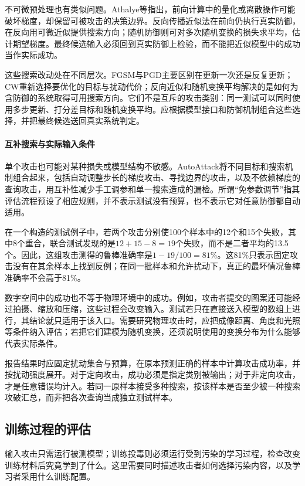 不可微预处理也有类似问题。Athalye等指出，前向计算中的量化或离散操作可能破坏梯度，却保留可被攻击的决策边界。反向传播近似法在前向仍执行真实防御，在反向用可微近似提供搜索方向；随机防御则可对多次随机变换的损失求平均，估计期望梯度。最终候选输入必须回到真实防御上检验，而不能把近似模型中的成功当作实际成功。

这些搜索改动处在不同层次。FGSM与PGD主要区别在更新一次还是反复更新；CW重新选择要优化的目标与扰动代价；反向近似和随机变换平均解决的是如何为含防御的系统取得可用搜索方向。它们不是互斥的攻击类别：同一测试可以同时使用多步更新、打分差目标和随机变换平均。应根据模型接口和防御机制组合这些选择，并把最终候选送回真实系统判定。

\paragraph{互补搜索与实际输入条件}

单个攻击也可能对某种损失或模型结构不敏感。AutoAttack将不同目标和搜索机制组合起来，包括自动调整步长的梯度攻击、寻找边界的攻击，以及不依赖梯度的查询攻击，用互补性减少手工调参和单一搜索造成的漏检。所谓“免参数调节”指其评估流程预设了相应规则，并不表示测试没有预算，也不表示它对任意防御都自动适用。

在一个构造的测试例子中，若两个攻击分别使100个样本中的12个和15个失败，其中8个重合，联合测试发现的是$12+15-8=19$个失败，而不是二者平均的13.5个。因此，这组攻击测得的鲁棒准确率是$1-19/100=81\%$。这81\%只表示固定攻击没有在其余样本上找到反例；在同一批样本和允许扰动下，真正的最坏情况鲁棒准确率不会高于81\%。

数字空间中的成功也不等于物理环境中的成功。例如，攻击者提交的图案还可能经过拍摄、缩放和压缩，这些过程会改变输入。测试若只在直接送入模型的数组上进行，其结论就只适用于该入口。需要研究物理攻击时，应把成像距离、角度和光照等条件纳入评估；若把它们建模为随机变换，还须说明使用的变换分布为什么能够代表实际条件。

报告结果时应固定扰动集合与预算，在原本预测正确的样本中计算攻击成功率，并按扰动强度展开。对于定向攻击，成功必须是指定类别被输出；对于非定向攻击，才是任意错误均计入。若同一原样本接受多种搜索，按该样本是否至少被一种搜索攻破汇总，而非把各次查询当成独立测试样本。

\subsection{训练过程的评估}
\label{sec:security-training-test}

输入攻击只需运行被测模型；训练投毒则必须运行受到污染的学习过程，检查改变训练材料后究竟学到了什么。这里需要同时描述攻击者如何选择污染内容，以及学习者采用什么训练配置。

